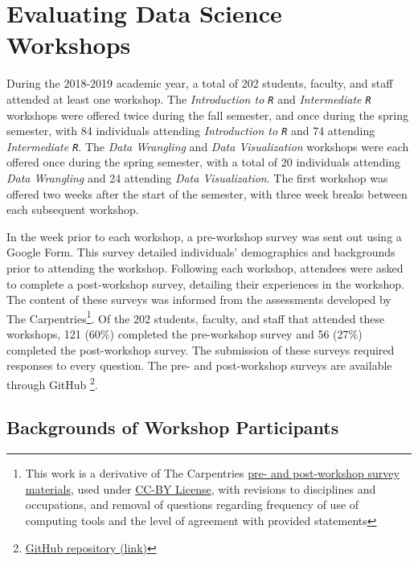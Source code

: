 \documentclass[12pt]{article}
\newcommand{\R}{\texttt{R}}
\begin{document}
\section{Evaluating Data Science Workshops}
\label{sec:implement}

\noindent During the 2018-2019 academic year, a total of 202 students, faculty,
and staff attended at least one workshop. The \emph{Introduction to \R} and
\emph{Intermediate \R} workshops were offered twice during the fall semester,
and once during the spring semester, with 84 individuals attending 
\emph{Introduction to \R} and 74 attending \emph{Intermediate \R}. The 
\emph{Data Wrangling} and \emph{Data Visualization} workshops were each offered
once during the spring semester, with a total of 20 individuals attending 
\emph{Data Wrangling} and 24 attending \emph{Data Visualization}. The first
workshop was offered two weeks after the start of the semester, with three week
breaks between each subsequent workshop. 

\enlargethispage{0.25in}

\quad In the week prior to each workshop, a pre-workshop survey was
sent out using a Google Form. This survey detailed individuals' demographics and
backgrounds prior to attending the workshop. Following each workshop, attendees
were asked to complete a post-workshop survey, detailing their experiences in
the workshop.  The content of these surveys was informed from the assessments 
developed by The Carpentries\footnote{This work is a
derivative of The Carpentries \href{https://carpentries.org/assessment/}{pre-
and post-workshop survey materials}, used under 
\href{https://creativecommons.org/licenses/by/4.0/}{CC-BY License}, with
revisions to disciplines and occupations, and removal of questions regarding
frequency of use of computing tools and the level of agreement with provided
statements}. Of the 202 students, faculty, and staff that attended these
workshops, 121 (60\%) completed the pre-workshop survey and 56 (27\%) completed
the post-workshop survey. The submission of these surveys required responses to
every question. The pre- and post-workshop surveys are available through GitHub 
\footnote{\href{https://github.com/atheobold/data-science-workshops-jse}{GitHub 
repository (link)}}. 


\subsection{Backgrounds of Workshop Participants}
\end{document}
